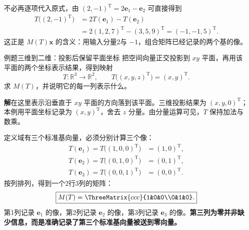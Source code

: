 \documentclass[a4paper,12pt,twoside,openany,fontset=none]{ctexbook}
\newcounter{example}[chapter]
\newenvironment{example}[1][]{\begin{exBox}{例题}{#1}}{\end{exBox}}
\numberwithin{equation}{chapter}
\begin{document}
不必再逐项代入原式，由 $(2,-1)^{\mathrm T}=2\boldsymbol e_1-\boldsymbol e_2$ 可直接得到
\[
\begin{aligned}
 T\bigl((2,-1)^{\mathrm T}\bigr)&=2T(\boldsymbol e_1)-T(\boldsymbol e_2)\\
 &=2(1,2,7)^{\mathrm T}-(3,5,9)^{\mathrm T}=(-1,-1,5)^{\mathrm T}.
\end{aligned}
\]
这正是 $M(T)\boldsymbol x$ 的含义：用输入分量2与 $-1$，组合矩阵已经记录的两个基的像。

\clearpage
\setlength{\parskip}{2pt}
\setlength{\abovedisplayskip}{6pt}
\setlength{\belowdisplayskip}{6pt}
\begin{example}[三维到二维：投影后保留平面坐标]
把空间向量正交投影到 $xy$ 平面，再用该平面的两个坐标表示结果，得到映射
\[
    T:\mathbb R^3\to\mathbb R^2,\qquad
    T\bigl((x,y,z)^{\mathrm T}\bigr)=(x,y)^{\mathrm T}.
\]
求 $M(T)$，并说明它的每一列表示什么。
\end{example}

\textbf{解}\quad {}在这里表示沿垂直于 $xy$ 平面的方向落到该平面。三维投影结果为 $(x,y,0)^{\mathrm T}$；本例用平面坐标记录为 $(x,y)^{\mathrm T}$，舍去 $z$ 分量。由分量运算可见，$T$ 保持加法与数乘。

定义域有三个标准基向量，必须分别计算三个像：
\[
\begin{aligned}
 T(\boldsymbol e_1)=T\bigl((1,0,0)^{\mathrm T}\bigr)&=(1,0)^{\mathrm T},\\
 T(\boldsymbol e_2)=T\bigl((0,1,0)^{\mathrm T}\bigr)&=(0,1)^{\mathrm T},\\
 T(\boldsymbol e_3)=T\bigl((0,0,1)^{\mathrm T}\bigr)&=(0,0)^{\mathrm T}.
\end{aligned}
\]
按列排列，得到一个2行3列的矩阵：
\[
    \boxed{M(T)=\ThreeMatrix{ccc}{1&0&0\\0&1&0}.}
\]
第1列记录 $\boldsymbol e_1$ 的像，第2列记录 $\boldsymbol e_2$ 的像，第3列记录 $\boldsymbol e_3$ 的像。\textbf{第三列为零并非缺少信息，而是准确记录了第三个标准基向量被送到零向量。}
\end{document}
